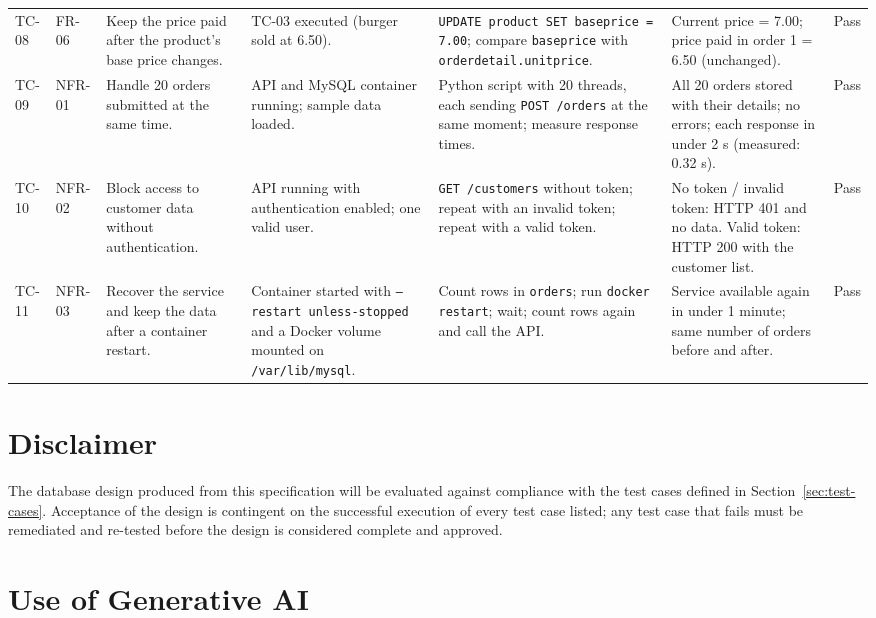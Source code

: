 \documentclass[11pt]{article}
\renewcommand{\_}{\oldunderscore\allowbreak}
\begin{document}
{\begin{longtable}{@{}L{1.1cm}L{1.2cm}L{2.5cm}L{2.6cm}L{2.9cm}L{2.6cm}L{1.3cm}@{}}
TC-08 & FR-06 & Keep the price paid after the product's base price changes. & TC-03 executed (burger sold at 6.50). & \texttt{UPDATE product SET base\_price = 7.00}; compare \texttt{base\_price} with \texttt{order\_detail.unit\_price}. & Current price = 7.00; price paid in order 1 = 6.50 (unchanged). & Pass \\[0.8em]
TC-09 & NFR-01 & Handle 20 orders submitted at the same time. & API and MySQL container running; sample data loaded. & Python script with 20 threads, each sending \texttt{POST /orders} at the same moment; measure response times. & All 20 orders stored with their details; no errors; each response in under 2 s (measured: 0.32 s). & Pass \\[0.8em]
TC-10 & NFR-02 & Block access to customer data without authentication. & API running with authentication enabled; one valid user. & \texttt{GET /customers} without token; repeat with an invalid token; repeat with a valid token. & No token / invalid token: HTTP 401 and no data. Valid token: HTTP 200 with the customer list. & Pass \\[0.8em]
TC-11 & NFR-03 & Recover the service and keep the data after a container restart. & Container started with \texttt{--restart unless-stopped} and a Docker volume mounted on \texttt{/var/lib/mysql}. & Count rows in \texttt{orders}; run \texttt{docker restart}; wait; count rows again and call the API. & Service available again in under 1 minute; same number of orders before and after. & Pass \\[0.8em]
\bottomrule
\end{longtable}
}

\section{Disclaimer}

The database design produced from this specification will be evaluated against compliance with the test cases defined in Section~\ref{sec:test-cases}. Acceptance of the design is contingent on the successful execution of every test case listed; any test case that fails must be remediated and re-tested before the design is considered complete and approved.

\clearpage
\section{Use of Generative AI}
\end{document}
